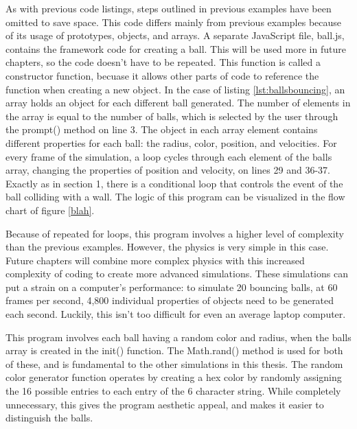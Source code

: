 As with previous code listings, steps outlined in previous examples have been omitted to save space.  This code differs mainly from previous examples because of its usage of prototypes, objects, and arrays.  A separate JavaScript file, ball.js, contains the framework code for creating a ball.  This will be used more in future chapters, so the code doesn't have to be repeated.  This function is called a constructor function, becuase it allows other parts of code to reference the function when creating a new object.  In the case of listing \ref{lst:ballsbouncing}, an array holds an object for each different ball generated.  The number of elements in the array is equal to the number of balls, which is selected by the user through the prompt() method on line 3.  The object in each array element contains different properties for each ball: the radius, color, position, and velocities.  For every frame of the simulation, a loop cycles through each element of the balls array, changing the properties of position and velocity, on lines 29 and 36-37.  Exactly as in section 1, there is a conditional loop that controls the event of the ball colliding with a wall.  The logic of this program can be visualized in the flow chart of figure \ref{blah}.

Because of repeated for loops, this program involves a higher level of complexity than the previous examples.  However, the physics is very simple in this case.  Future chapters will combine more complex physics with this increased complexity of coding to create more advanced simulations.  These simulations can put a strain on a computer's performance: to simulate 20  bouncing balls, at 60 frames per second, 4,800 individual properties of objects need to be generated each second.  Luckily, this isn’t too difficult for even an average laptop computer.  

This program involves each ball having a random color and radius, when the balls array is created in the init() function.  The Math.rand() method is used for both of these, and is fundamental to the other simulations in this thesis.  The random color generator function operates by creating a hex color by randomly assigning the 16 possible entries to each entry of the 6 character string.  While completely unnecessary, this gives the program aesthetic appeal, and makes it easier to distinguish the balls.

